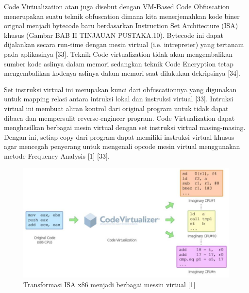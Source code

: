 Code Virtualization atau juga disebut dengan VM-Based Code Obfuscation menerupakan suatu teknik obfuscation dimana kita menerjemahkan kode biner orignal menjadi bytecode baru berdasarkan Instruction Set Architecture (ISA) khusus (Gambar BAB II TINJAUAN PUSTAKA.10). Bytecode ini dapat dijalankan secara run-time dengan mesin virtual (i.e. intrepreter) yang tertanam pada aplikasinya [33]. Teknik Code virtualization tidak akan mengembalikan sumber kode aslinya dalam memori sedangkan teknik Code Encryption tetap mengembalikan kodenya aslinya dalam memori saat dilakukan dekripsinya [34].

Set instruksi virtual ini merupakan kunci dari obfuscationnya yang digunakan untuk mapping relasi antara intruksi lokal dan instruksi virtual [33]. Intruksi virtual ini membuat aliran kontrol dari original program untuk tidak dapat dibaca dan mempersulit reverse-engineer program. Code Virtualization dapat menghasilkan berbagai mesin virtual dengan set instruksi virtual masing-masing. Dengan ini, setiap copy dari program dapat memiliki instruksi virtual khusus agar mencegah penyerang untuk mengenali opcode mesin virtual menggunakan metode Frequency Analysis [1] [33].

\begin{figure}
	\centering
	\includegraphics[width=1\textwidth]
	{assets/pics/multiple_virtualization.jpg}
	\caption{Transformasi ISA x86 menjadi berbagai messin virtual [1]}
\end{figure}


